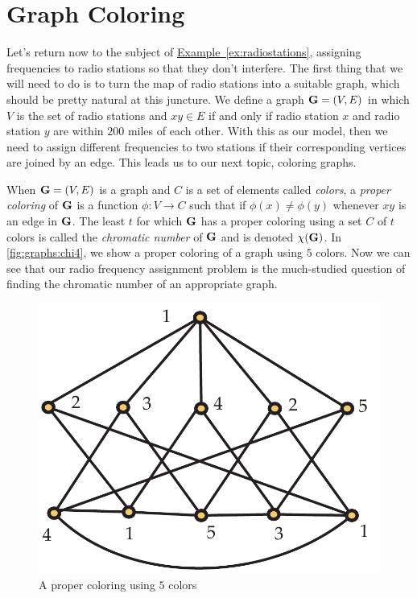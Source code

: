 \section{Graph Coloring}\label{s:graphs:color}

Let's return now to the subject of
\hyperref[ex:radiostations]{Example~\ref*{ex:radiostations}},
assigning frequencies to radio stations so that they don't
interfere. The first thing that we will need to do is to turn the map
of radio stations into a suitable graph, which should be pretty
natural at this juncture. We define a graph $\mathbf{G}=(V,E)$ in which $V$ is the
set of radio stations and $xy\in E$ if and only if radio station $x$
and radio station $y$ are within $200$ miles of each other. With this
as our model, then we need to assign different frequencies to two
stations if their corresponding vertices are joined by an edge. This
leads us to our next topic, coloring graphs.

When $\mathbf{G}=(V,E)$ is a graph and $C$ is a set of elements called
\textit{colors}, a \textit{proper coloring} of $\mathbf{G}$ is a function
$\phi:V\to C$ such that if $\phi(x)\neq \phi(y)$ whenever $xy$ is an
edge in $\mathbf{G}$.  The least $t$ for which $\mathbf{G}$ has a proper coloring
using a set $C$ of $t$ colors is called the \textit{chromatic number}
of $\mathbf{G}$ and is denoted $\chi(\mathbf{G})$.  In \autoref{fig:graphs:chi4},
we show a proper coloring of a graph using $5$ colors. Now we can see
that our radio frequency assignment problem is the much-studied
question of finding the chromatic number of an appropriate graph.
\begin{figure}[h]
\begin{center}
\includegraphics*[scale=0.63]{graphs-figs/chi4}
\caption{\label{fig:graphs:chi4}A proper coloring using $5$ colors}
\end{center}
\end{figure}

